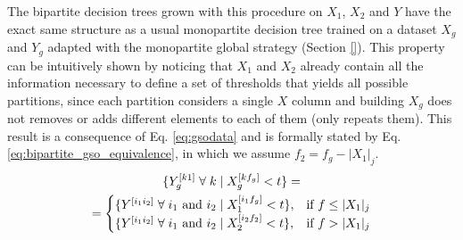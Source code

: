 The bipartite decision trees grown with this procedure on $X_1$, $X_2$ and $Y$ have the exact same structure as a usual monopartite decision tree trained on a dataset $X_g$ and $Y_g$ adapted with the monopartite global strategy (Section \ref{}). This property can be intuitively shown by noticing that $X_1$ and $X_2$ already contain all the information necessary to define a set of thresholds that yields all possible partitions, since each partition considers a single $X$ column and building $X_g$ does not removes or adds different elements to each of them (only repeats them).
This result is a consequence of Eq. \ref{eq:gsodata} and is formally stated by Eq. \ref{eq:bipartite_gso_equivalence}, in which we assume $f_2 = f_g-|X_1|_j$.
%
\begin{multline}
    \{Y_g^{[k1]}\;\forall\; k \mid X_g^{[kf_g]} < t\} =\\
    =\begin{cases}
        \{Y^{[i_1i_2]} \;\forall\; i_1\text{ and }i_2 \mid X_1^{[i_1f_g]}<t\}, & \text{if } f \le |X_1|_j\\
        \{Y^{[i_1i_2]} \;\forall\; i_1\text{ and }i_2 \mid X_2^{[i_2f_2]}<t\}, & \text{if } f > |X_1|_j
    \end{cases}
    \label{eq:bipartite_gso_equivalence}
\end{multline}



